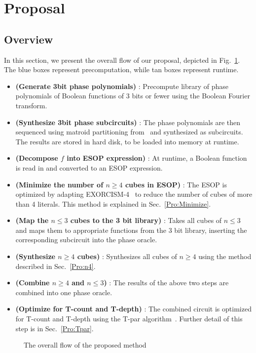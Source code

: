 
\section{Proposal}
\label{Pro}
\subsection{Overview}

In this section, we present the overall flow of our proposal, depicted in Fig.~\ref{fig-flow}. The blue boxes represent precomputation, while tan boxes represent runtime.

\begin{itemize}
\item \textbf{(Generate 3bit phase polynomials)} : Precompute library of phase polynomials of Boolean functions of
  3 bits or fewer using the Boolean Fourier transform.
\item \textbf{(Synthesize 3bit phase subcircuits)} : The phase polynomials are then sequenced using matroid
  partitioning from~\cite{bib-amy-matroid} and synthesized as subcircuits. The results are stored in hard disk,
  to be loaded into memory at runtime.
\item \textbf{(Decompose $f$ into ESOP expression)} : At runtime, a Boolean function is read in and converted to
  an ESOP expression.
\item \textbf{(Minimize the number of $n \geq 4$ cubes in ESOP)} : The ESOP is optimized by adapting
  EXORCISM-4~\cite{bib-exorcism} to reduce the number of cubes of more than 4 literals. This method is explained
  in Sec.~\ref{Pro:Minimize}.
\item \textbf{(Map the $n \leq 3$ cubes to the 3 bit library)} : Takes all cubes of $n \leq 3$ and maps them to 
  appropriate functions from the 3 bit library, inserting the corresponding subcircuit into the phase oracle.
\item \textbf{(Synthesize $n \geq 4$ cubes)} : Synthesizes all cubes of $n \geq 4$ using the method described in
  Sec.~\ref{Pro:n4}.
\item \textbf{(Combine $n \geq 4$ and $n \leq 3$)} : The results of the above two steps are combined into one
  phase oracle.
\item \textbf{(Optimize for T-count and T-depth)} : The combined circuit is optimized for T-count and T-depth using
  the T-par algorithm~\cite{bib-amy-matroid}. Further detail of this step is in Sec.~\ref{Pro:Tpar}.
\end{itemize}
\begin{figure}[t]
  \centering
  \scalebox{1.0} {
    
  }
  \caption{The overall flow of the proposed method}
  \label{fig-flow}
\end{figure}

